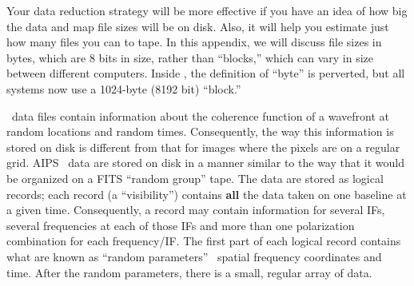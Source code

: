 
\def\text#1{\hbox{\it#1}}
\def\chapt{Y}
\def\titlea{15-Jul-1995}

\def\Chapt{45}
\pd

Your data reduction strategy will be more effective if you have an
idea of how big the data and map file sizes will be on disk.  Also, it
will help you estimate just how many files you can  to
tape.  In this appendix, we will discuss file sizes in bytes, which
are 8 bits in size, rather than ``blocks,'' which can vary in size
between different computers.  Inside \AIPS, the definition of ``byte''
is perverted, but all systems now use a 1024-byte (8192 bit)
``block.''


     \uv\ data files contain information about the coherence function
of a wavefront at random locations and random times.  Consequently,
the way this information is stored on disk is different from that for
images where the pixels are on a regular grid.  AIPS \uv\ data are
stored on disk in a manner similar to the way that it would be
organized on a FITS ``random group'' tape.  The data are stored as
logical records; each record (a ``visibility'') contains {\bf all} the
data taken on one baseline at a given time.  Consequently, a record
may contain information for several IFs, several frequencies at each
of those IFs and more than one polarization combination for each
frequency/IF.  The first part of each logical record contains what are
known as ``random parameters'' \eg\ spatial frequency coordinates and
time.  After the random parameters, there is a small, regular array of
data.

